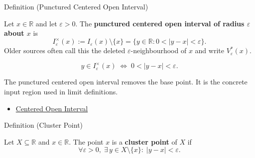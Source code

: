 \begin{definitionbox}{Definition (Punctured Centered Open Interval)}
\begin{definition}
\label{def:deleted-epsilon-neighbourhood}
Let $x\in\mathbb{R}$ and let $\varepsilon>0$. The
\textbf{punctured centered open interval of radius $\varepsilon$ about $x$} is
\[
  I_\varepsilon^\times(x):=I_\varepsilon(x)\setminus\{x\}
  =\{y\in\mathbb{R}:0<|y-x|<\varepsilon\}.
\]
Older sources often call this the deleted $\varepsilon$-neighbourhood of $x$
and write $V_\varepsilon^*(x)$.
\end{definition}
\end{definitionbox}

\begin{remark*}
\[
  y\in I_\varepsilon^\times(x)\;\Longleftrightarrow\;0<|y-x|<\varepsilon.
\]
\end{remark*}

\begin{remark*}[Interpretation]
The punctured centered open interval removes the base point. It is the concrete
input region used in limit definitions.
\end{remark*}

\begin{dependencies}
\begin{itemize}
  \item \hyperref[def:epsilon-neighbourhood]{Centered Open Interval}
\end{itemize}
\end{dependencies}


\begin{definitionbox}{Definition (Cluster Point)}
\begin{definition}
\label{def:cluster-point-r}
Let $X \subseteq \mathbb{R}$ and $x \in \mathbb{R}$. The point $x$
is a \textbf{cluster point} of $X$ if
\[
  \forall\varepsilon > 0,\;
  \exists\, y \in X \setminus \{x\} :\;
  |y-x|<\varepsilon.
\]
\end{definition}
\end{definitionbox}

